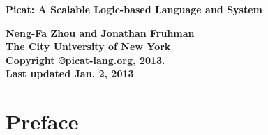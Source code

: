 \documentclass[11pt]{report}
\begin{document}
\vspace*{4cm}
\begin{center}
{\Huge\bf Picat: A Scalable Logic-based Language and System} \\

\vspace*{8cm}

{\large\bf Neng-Fa Zhou and Jonathan Fruhman} \\
{\large\bf The City University of New York} \\
\vspace*{1cm}
{\bf Copyright \copyright picat-lang.org, 2013.} \\
{\bf Last updated Jan. 2, 2013} \\
\end{center}
\thispagestyle{empty}
\clearpage

\section*{Preface}



\tableofcontents




















\end{document}
